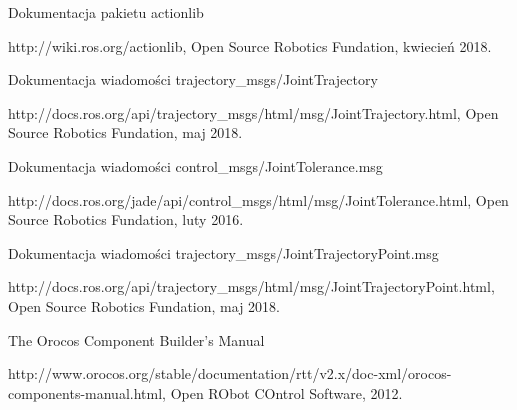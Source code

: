 \documentclass[a4paper, 12pt]{article}
\begin{document}
\newpage	
\begin{thebibliography}{9}
Dokumentacja pakietu actionlib

http://wiki.ros.org/actionlib, Open Source Robotics Fundation, kwiecień 2018.

Dokumentacja wiadomości trajectory\_msgs/JointTrajectory

http://docs.ros.org/api/trajectory\_msgs/html/msg/JointTrajectory.html, Open Source Robotics Fundation, maj 2018.

Dokumentacja wiadomości control\_msgs/JointTolerance.msg

http://docs.ros.org/jade/api/control\_msgs/html/msg/JointTolerance.html, Open Source Robotics Fundation, luty 2016.

Dokumentacja wiadomości trajectory\_msgs/JointTrajectoryPoint.msg

http://docs.ros.org/api/trajectory\_msgs/html/msg/JointTrajectoryPoint.html, Open Source Robotics Fundation, maj 2018.

The Orocos Component Builder's Manual

 http://www.orocos.org/stable/documentation/rtt/v2.x/doc-xml/orocos-components-manual.html, Open RObot COntrol Software, 2012.
\end{thebibliography}	
	
\end{document}
